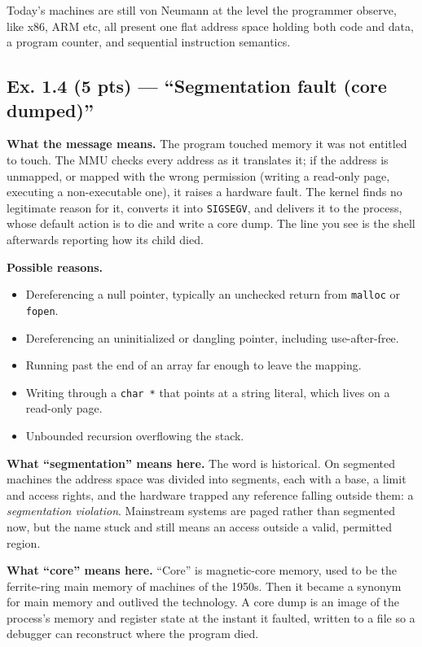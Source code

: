 Today's machines are still von Neumann at the level the programmer observe, like x86, ARM
etc, all present one flat address space holding both code and data, a program
counter, and sequential instruction semantics. 

\subsection*{Ex. 1.4 (5 pts) --- ``Segmentation fault (core dumped)''}
\label{p1:sec:segfault}

\textbf{What the message means.} The program touched memory it was not entitled to
touch. The MMU checks every address as it translates it; if the address is unmapped,
or mapped with the wrong permission (writing a read-only page, executing a
non-executable one), it raises a hardware fault. The kernel finds no legitimate
reason for it, converts it into \texttt{SIGSEGV}, and delivers it to the process,
whose default action is to die and write a core dump. The line you see is the shell
afterwards reporting how its child died.

\textbf{Possible reasons.}
\begin{itemize}[nosep,leftmargin=1.4em,label=$\bullet$]
  \item Dereferencing a null pointer, typically an unchecked return from
        \texttt{malloc} or \texttt{fopen}.
  \item Dereferencing an uninitialized or dangling pointer, including use-after-free.
  \item Running past the end of an array far enough to leave the mapping.
  \item Writing through a \texttt{char *} that points at a string literal, which
        lives on a read-only page.
  \item Unbounded recursion overflowing the stack.
\end{itemize}

\textbf{What ``segmentation'' means here.} The word is historical. On segmented
machines the address space was divided into segments, each with a base, a limit and
access rights, and the hardware trapped any reference falling outside them: a
\emph{segmentation violation}. Mainstream systems are paged rather than segmented
now, but the name stuck and still means an access outside a valid, permitted region.

\textbf{What ``core'' means here.} ``Core'' is magnetic-core memory, used to be the ferrite-ring
main memory of machines of the 1950s. Then it became a synonym for main memory and
outlived the technology. A core dump is an image of the process's memory and register
state at the instant it faulted, written to a file so a debugger can reconstruct where
the program died.

